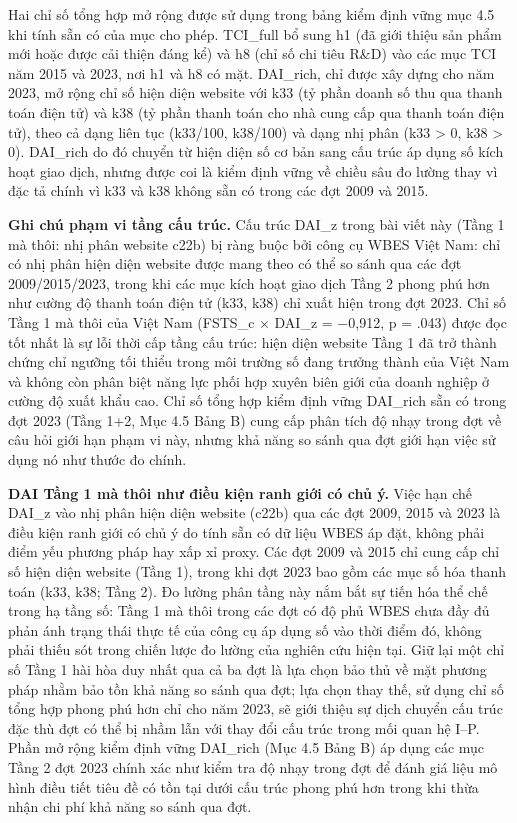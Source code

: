 \documentclass[12pt,a4paper]{article}
\begin{document}
Hai chỉ số tổng hợp mở rộng được sử dụng trong bảng kiểm định vững mục
4.5 khi tính sẵn có của mục cho phép. TCI\_full bổ sung h1 (đã giới
thiệu sản phẩm mới hoặc được cải thiện đáng kể) và h8 (chỉ số chi tiêu
R\&D) vào các mục TCI năm 2015 và 2023, nơi h1 và h8 có mặt. DAI\_rich,
chỉ được xây dựng cho năm 2023, mở rộng chỉ số hiện diện website với k33
(tỷ phần doanh số thu qua thanh toán điện tử) và k38 (tỷ phần thanh toán
cho nhà cung cấp qua thanh toán điện tử), theo cả dạng liên tục
(k33/100, k38/100) và dạng nhị phân (k33 \textgreater{} 0, k38
\textgreater{} 0). DAI\_rich do đó chuyển từ hiện diện số cơ bản sang
cấu trúc áp dụng số kích hoạt giao dịch, nhưng được coi là kiểm định
vững về chiều sâu đo lường thay vì đặc tả chính vì k33 và k38 không sẵn
có trong các đợt 2009 và 2015.

\textbf{Ghi chú phạm vi tầng cấu trúc.} Cấu trúc DAI\_z trong bài viết
này (Tầng 1 mà thôi: nhị phân website c22b) bị ràng buộc bởi công cụ
WBES Việt Nam: chỉ có nhị phân hiện diện website được mang theo có thể
so sánh qua các đợt 2009/2015/2023, trong khi các mục kích hoạt giao
dịch Tầng 2 phong phú hơn như cường độ thanh toán điện tử (k33, k38) chỉ
xuất hiện trong đợt 2023. Chỉ số Tầng 1 mà thôi của Việt Nam (FSTS\_c ×
DAI\_z = −0,912, p = .043) được đọc tốt nhất là sự lỗi thời cấp tầng cấu
trúc: hiện diện website Tầng 1 đã trở thành chứng chỉ ngưỡng tối thiểu
trong môi trường số đang trưởng thành của Việt Nam và không còn phân
biệt năng lực phối hợp xuyên biên giới của doanh nghiệp ở cường độ xuất
khẩu cao. Chỉ số tổng hợp kiểm định vững DAI\_rich sẵn có trong đợt 2023
(Tầng 1+2, Mục 4.5 Bảng B) cung cấp phân tích độ nhạy trong đợt về câu
hỏi giới hạn phạm vi này, nhưng khả năng so sánh qua đợt giới hạn việc
sử dụng nó như thước đo chính.

\textbf{DAI Tầng 1 mà thôi như điều kiện ranh giới có chủ ý.} Việc hạn
chế DAI\_z vào nhị phân hiện diện website (c22b) qua các đợt 2009, 2015
và 2023 là điều kiện ranh giới có chủ ý do tính sẵn có dữ liệu WBES áp
đặt, không phải điểm yếu phương pháp hay xấp xỉ proxy. Các đợt 2009 và
2015 chỉ cung cấp chỉ số hiện diện website (Tầng 1), trong khi đợt 2023
bao gồm các mục số hóa thanh toán (k33, k38; Tầng 2). Đo lường phân tầng
này nắm bắt sự tiến hóa thể chế trong hạ tầng số: Tầng 1 mà thôi trong
các đợt có độ phủ WBES chưa đầy đủ phản ánh trạng thái thực tế của công
cụ áp dụng số vào thời điểm đó, không phải thiếu sót trong chiến lược đo
lường của nghiên cứu hiện tại. Giữ lại một chỉ số Tầng 1 hài hòa duy
nhất qua cả ba đợt là lựa chọn bảo thủ về mặt phương pháp nhằm bảo tồn
khả năng so sánh qua đợt; lựa chọn thay thế, sử dụng chỉ số tổng hợp
phong phú hơn chỉ cho năm 2023, sẽ giới thiệu sự dịch chuyển cấu trúc
đặc thù đợt có thể bị nhầm lẫn với thay đổi cấu trúc trong mối quan hệ
I--P. Phần mở rộng kiểm định vững DAI\_rich (Mục 4.5 Bảng B) áp dụng các
mục Tầng 2 đợt 2023 chính xác như kiểm tra độ nhạy trong đợt để đánh giá
liệu mô hình điều tiết tiêu đề có tồn tại dưới cấu trúc phong phú hơn
trong khi thừa nhận chi phí khả năng so sánh qua đợt.
\end{document}
